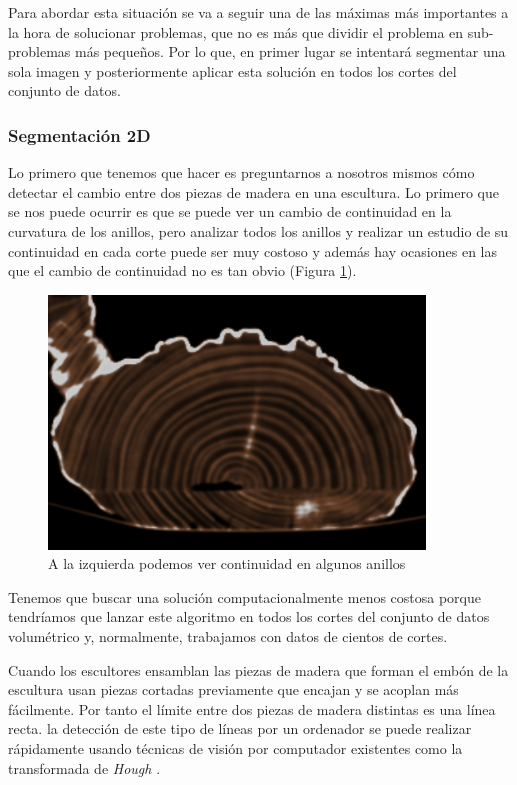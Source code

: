 Para abordar esta situación se va a seguir una de las máximas más importantes a la hora de solucionar problemas, que no es más que dividir el problema en sub-problemas más pequeños. Por lo que, en primer lugar se intentará segmentar una sola imagen y posteriormente aplicar esta solución en todos los cortes del conjunto de datos.

\subsubsection{Segmentación 2D}

Lo primero que tenemos que hacer es preguntarnos a nosotros mismos cómo detectar el cambio entre dos piezas de madera en una escultura. Lo primero que se nos puede ocurrir es que se puede ver un cambio de continuidad en la curvatura de los anillos, pero analizar todos los anillos y realizar un estudio de su continuidad en cada corte puede ser muy costoso y además hay ocasiones en las que el cambio de continuidad no es tan obvio (Figura \ref{fig:desarrollo/continuidad-anillos}).

\begin{figure}[H]
	\centering
	\includegraphics[width=10cm]{imagenes/desarrollo/continuidad-anillos}
	\caption{A la izquierda podemos ver continuidad en algunos anillos}
	\label{fig:desarrollo/continuidad-anillos}
\end{figure}

Tenemos que buscar una solución computacionalmente menos costosa porque tendríamos que lanzar este algoritmo en todos los cortes del conjunto de datos volumétrico y, normalmente, trabajamos con datos de cientos de cortes.

Cuando los escultores ensamblan las piezas de madera que forman el embón de la escultura usan piezas cortadas previamente que encajan y se acoplan más fácilmente. Por tanto el límite entre dos piezas de madera distintas es una línea recta. la detección de este tipo de líneas por un ordenador se puede realizar rápidamente usando técnicas de visión por computador existentes como la transformada de \textit{Hough} \cite{duda72}.

